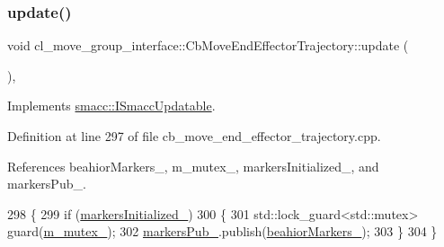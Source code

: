 \mbox{\label{classcl__move__group__interface_1_1CbMoveEndEffectorTrajectory_a57fedb6a0603fe569842a13faf19f5cd}} 
\subsubsection{\texorpdfstring{update()}{update()}}
{\footnotesize\ttfamily void cl\+\_\+move\+\_\+group\+\_\+interface\+::\+Cb\+Move\+End\+Effector\+Trajectory\+::update (\begin{DoxyParamCaption}{ }\end{DoxyParamCaption})\hspace{0.3cm}{\ttfamily [override]}, {\ttfamily [virtual]}}



Implements \hyperlink{classsmacc_1_1ISmaccUpdatable_a84ee0520cbefdb1d412bed54650b028e}{smacc\+::\+I\+Smacc\+Updatable}.



Definition at line 297 of file cb\+\_\+move\+\_\+end\+\_\+effector\+\_\+trajectory.\+cpp.



References beahior\+Markers\+\_\+, m\+\_\+mutex\+\_\+, markers\+Initialized\+\_\+, and markers\+Pub\+\_\+.


\begin{DoxyCode}
298     \{
299         \textcolor{keywordflow}{if} (\hyperlink{classcl__move__group__interface_1_1CbMoveEndEffectorTrajectory_ac140a7f0adfb20f1e2900a5c8cd2ca5b}{markersInitialized\_})
300         \{
301             std::lock\_guard<std::mutex> guard(\hyperlink{classcl__move__group__interface_1_1CbMoveEndEffectorTrajectory_a2a98ef725cb3fc7f61654d3d6a2066bb}{m\_mutex\_});
302             \hyperlink{classcl__move__group__interface_1_1CbMoveEndEffectorTrajectory_aabc2216b2d8625fecd83c5ec69928e63}{markersPub\_}.publish(\hyperlink{classcl__move__group__interface_1_1CbMoveEndEffectorTrajectory_a809fb5385adf27c0a1c8f8136566949c}{beahiorMarkers\_});
303         \}
304     \}
\end{DoxyCode}



